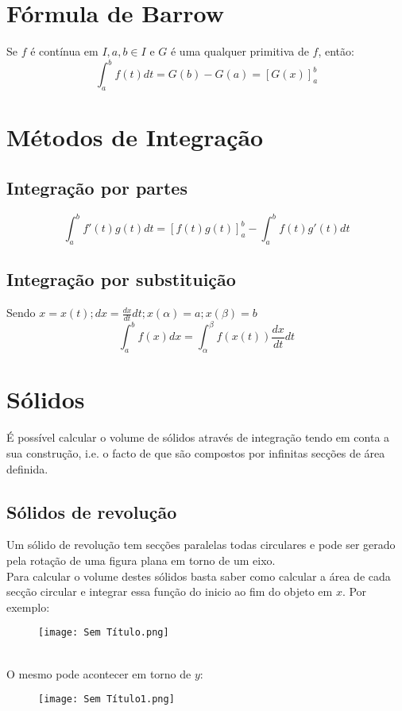 \documentclass[10pt,a4paper]{report}
\begin{document}
\section{Fórmula de Barrow}
Se $f$ é contínua em $I, a, b \in I$ e $G$ é uma qualquer primitiva de $f$, então:
$$
\int_{a}^{b} f(t) dt = G(b) - G(a) = [G(x)]^{b}_a
$$

\section{Métodos de Integração}
\subsection{Integração por partes}
$$
\int_{a}^{b} f'(t)g(t) dt = [f(t)g(t)]^{b}_a - \int_{a}^{b} f(t)g'(t) dt
$$
\subsection{Integração por substituição}
Sendo $x = x(t); dx = \frac{dx}{dt}dt; x(\alpha) = a; x(\beta) = b$
$$
\int_{a}^{b} f(x) dx = \int_{\alpha}^{\beta} f(x(t)) \frac{dx}{dt} dt
$$

\section{Sólidos}
É possível calcular o volume de sólidos através de integração tendo em conta a sua construção, i.e. o facto de que são compostos por infinitas secções de área definida.
\subsection{Sólidos de revolução}
Um sólido de revolução tem secções paralelas todas circulares e pode ser gerado pela rotação de uma figura plana em torno de um eixo.\\
Para calcular o volume destes sólidos basta saber como calcular a área de cada secção circular e integrar essa função do inicio ao fim do objeto em $x$. Por exemplo:
\begin{figure}[h]
\texttt{[image: Sem Título.png]}
\end{figure}
\\
O mesmo pode acontecer em torno de $y$:
\begin{figure}[h]
\texttt{[image: Sem Título1.png]}
\end{figure}
\end{document}
